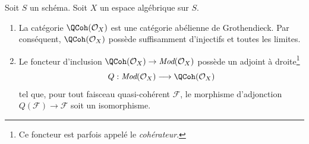 \begin{proposition}
\label{proposition-coherator}
Soit $S$ un schéma. Soit $X$ un espace algébrique sur $S$.
\begin{enumerate}
\item La catégorie $\QCoh(\mathcal{O}_X)$ est une catégorie
abélienne de Grothendieck. Par conséquent, $\QCoh(\mathcal{O}_X)$
possède suffisamment d'injectifs et toutes les limites.
\item Le foncteur d'inclusion
$\QCoh(\mathcal{O}_X) \to \textit{Mod}(\mathcal{O}_X)$
possède un adjoint à droite\footnote{Ce foncteur est parfois appelé
le {\it cohérateur}.}
$$
Q : \textit{Mod}(\mathcal{O}_X) \longrightarrow \QCoh(\mathcal{O}_X)
$$
tel que, pour tout faisceau quasi-cohérent $\mathcal{F}$, le morphisme d'adjonction
$Q(\mathcal{F}) \to \mathcal{F}$ soit un isomorphisme.
\end{enumerate}
\end{proposition}

